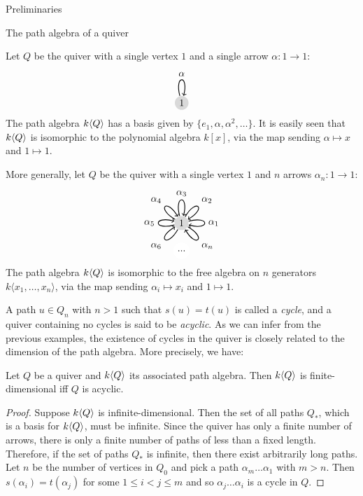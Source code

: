 \begin{chapter}{Preliminaries}
\begin{section}{The path algebra of a quiver}
\begin{exmp}\label{one-loop} Let $Q$ be the quiver with a single vertex $1$ and a single arrow $\alpha:1\to 1$:
\[
\begin{tikzpicture}[->, thick]
\tikzset{every loop/.style={looseness=15}}
\node[circle, fill=gray!30, minimum size=.5cm, inner sep=.07cm]  (1) {1};
\path (1) edge [loop above] node {$\alpha$} (1);
\end{tikzpicture}
\]
The path algebra $k\langle Q\rangle$ has a basis given by $\{e_1, \alpha, \alpha^2, \dots\}$. It is easily seen that $k\langle Q\rangle$ is isomorphic to the polynomial algebra $k[x]$, via the map sending $\alpha \mapsto x$ and $1\mapsto 1$.
\end{exmp}
\begin{exmp}\label{several-loops} More generally, let $Q$ be the quiver with a single vertex $1$ and $n$ arrows $\alpha_n:1\to 1$:
\[
\begin{tikzpicture}[->, auto, thick]
\tikzset{every loop/.style={looseness=15}}
\node[circle, fill=gray!30, minimum size=.5cm, inner sep=.07cm]  (1) {1};
\node[circle, fill=white] (2) at +(270: 1) {...};
\path (1) edge [loop left] node {$\alpha_5$} (1);
\path (1) edge [loop above] node {$\alpha_3$} (1);
\path (1) edge [loop right] node {$\alpha_1$} (1);
\path (1) edge [in=30, out=60, loop] node {$\alpha_2$} (1);
\path (1) edge [in=210, out=240, loop] node {$\alpha_6$} (1);
\path (1) edge [in=120, out=150, loop] node {$\alpha_4$} (1);
\path (1) edge [in=300, out=330, loop] node {$\alpha_n$} (1);
\end{tikzpicture}
\]
The path algebra $k\langle Q\rangle$ is isomorphic to the free algebra on $n$ generators $k\langle x_1,\dots, x_n\rangle$, via the map sending $\alpha_i\mapsto x_i$ and $1\mapsto 1$.
\end{exmp}

A path $u\in Q_n$ with $n>1$ such that $s(u)=t(u)$ is called a \emph{cycle}, and a quiver containing no cycles is said to be \emph{acyclic}. As we can infer from the previous examples, the existence of cycles in the quiver is closely related to the dimension of the path algebra. More precisely, we have:

\begin{prop}\label{acyclic-fin-dim}
Let $Q$ be a quiver and $k\langle Q\rangle$ its associated path algebra. Then $k\langle Q\rangle$ is finite-dimensional iff $Q$ is acyclic.
\end{prop}
\begin{proof} Suppose $k\langle Q\rangle$ is infinite-dimensional. Then the set of all paths $Q_*$, which is a basis for $k\langle Q\rangle$, must be infinite. Since the quiver has only a finite number of arrows, there is only a finite number of paths of less than a fixed length. Therefore, if the set of paths $Q_*$ is infinite, then there exist arbitrarily long paths. Let $n$ be the number of vertices in $Q_0$ and pick a path $\alpha_m\dots\alpha_1$ with $m>n$. Then $s(\alpha_i) = t(\alpha_j)$ for some $1\leq i < j\leq m$ and so $\alpha_j\dots\alpha_i$ is a cycle in $Q$.


\end{proof}
\end{section}
\end{chapter}
